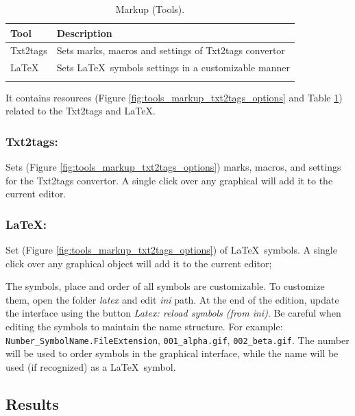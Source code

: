 \begin{table}
  \begin{footnotesize}
    \begin{tabularx}{\textwidth}{lX}\\
      \hline
      \textbf{Tool} & \textbf{Description} \\
      \hline
      Txt2tags & Sets marks, macros and settings of Txt2tags convertor \\
      LaTeX & Sets \LaTeX~symbols settings in a customizable manner \\
      \hline
      \\
    \end{tabularx}
  \end{footnotesize}
  \caption{Markup (Tools).}
  \label{tab:tools_markup}
\end{table}

It contains resources
(Figure \ref{fig:tools_markup_txt2tags_options} and
Table \ref{tab:tools_markup})
related to the Txt2tags and \LaTeX.


\subsubsection{Txt2tags:}

Sets
(Figure \ref{fig:tools_markup_txt2tags_options})
marks, macros, and settings for the Txt2tags convertor.
A single click over any graphical will add it to the current editor.


\subsubsection{LaTeX:}

Set
(Figure \ref{fig:tools_markup_txt2tags_options})
of \LaTeX~symbols. A single click over any graphical object
will add it to the current editor;

The symbols, place and order of all symbols are customizable.
To customize them, open the folder \textit{latex} and edit
\textit{ini} path. At the end of the edition, update the interface
using the button \textit{Latex: reload symbols (from ini)}. Be careful
when editing the symbols to maintain the name structure.
For example: \texttt{Number\_SymbolName.FileExtension},
\texttt{001\_alpha.gif}, \texttt{002\_beta.gif}. The number
will be used to order symbols in the graphical interface,
while the name will be used (if recognized) as a \LaTeX~symbol.


\hypertarget{working_tools_results}{}
\subsection{Results}

